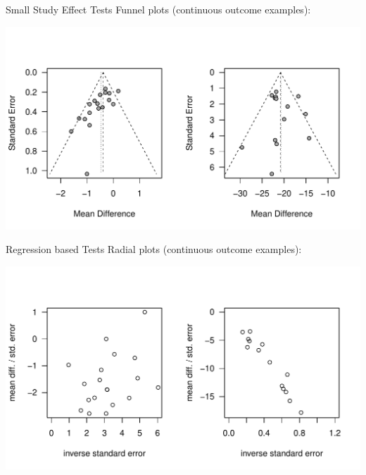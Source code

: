\documentclass[english]{beamer}\usepackage[]{graphicx}\usepackage[]{color}
\makeatletter
\def\maxwidth{ %
  \ifdim\Gin@nat@width>\linewidth
    \linewidth
  \else
    \Gin@nat@width
  \fi
}
\newenvironment{knitrout}{}{} %
\makeatother
\begin{document}
\begin{frame}[fragile]{Small Study Effect Tests}
Funnel plots (continuous outcome examples):

\vspace{-1.2cm}

\begin{knitrout}
\color{fgcolor}
\includegraphics[width=\maxwidth]{figure/unnamed-chunk-4-1} 

\end{knitrout}

\end{frame}


\begin{frame}[fragile]{Regression based Tests}
Radial plots (continuous outcome examples):

\vspace{-1.1cm}

\begin{knitrout}
\color{fgcolor}
\includegraphics[width=\maxwidth]{figure/unnamed-chunk-5-1} 

\end{knitrout}

\end{frame}
\end{document}
